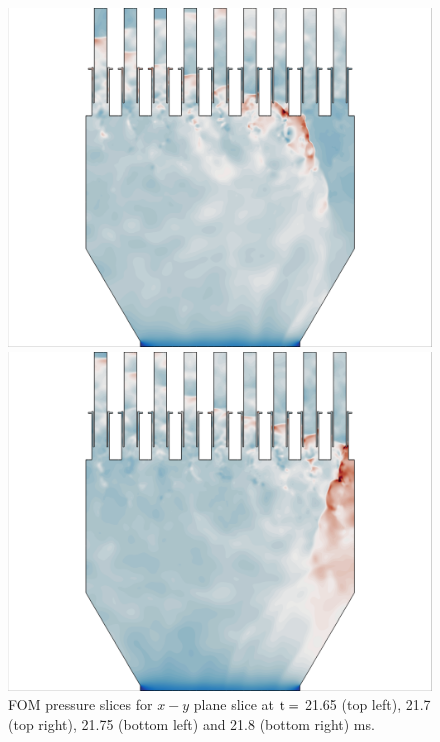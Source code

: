 \begin{figure}
	\begin{minipage}{0.49\linewidth}
		\includegraphics[width=0.99\linewidth,trim={0.5em 0.5em 15em 0.5em},clip]{Chapters/HPROMResults/Images/nineElem/example_snaps/example_pressure_z_217500.png}
	\end{minipage}
	\begin{minipage}{0.49\linewidth}
		\includegraphics[width=0.99\linewidth,trim={15em 0.5em 0.5em 0.5em},clip]{Chapters/HPROMResults/Images/nineElem/example_snaps/example_pressure_z_218000.png}
	\end{minipage}
	\caption{\label{fig:nineElemFOMPressure}FOM pressure slices for $x-y$ plane slice at $\text{t} = $ 21.65 (top left), 21.7 (top right), 21.75 (bottom left) and 21.8 (bottom right) ms.}
\end{figure}

